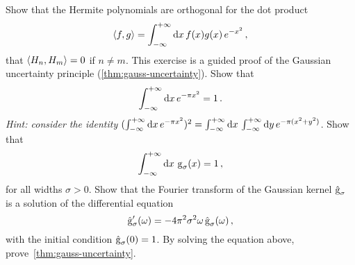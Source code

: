\begin{ExerciseList}
  \Question Show that the Hermite polynomials are orthogonal for the dot product
  \begin{equation}
    \braket{f,g}=\int_{-\infty}^{+\infty}\mathrm{d}{x}\,f(x)g(x)\,e^{-x^2}\,,
  \end{equation}
  \ie that $\braket{H_n,H_m}=0$ if $n\neq m$.
  \Exercise[label=gauss-uncertainty]
  This exercise is a guided proof of the
  Gaussian uncertainty principle (\cref{thm:gauss-uncertainty}).
  \Question Show that
  \begin{equation}
    \int_{-\infty}^{+\infty}\mathrm{d}{x}\,e^{-\pi x^2}=1\,.
  \end{equation}
  \emph{Hint: consider the identity }
  $(\int_{-\infty}^{+\infty}\mathrm{d}{x}\,e^{-\pi x^2})^2=\int_{-\infty}^{+\infty}\mathrm{d}{x}\,\int_{-\infty}^{+\infty}\mathrm{d}{y}\,e^{-\pi (x^2+y^2)}$.
  \Question Show that
  \begin{equation}
    \int_{-\infty}^{+\infty}\mathrm{d}{x}\,\operatorname{g}_{\sigma}(x)=1\,,
  \end{equation}
  for all widths $\sigma>0$.
  \Question Show that the Fourier transform of the Gaussian kernel $\hat{\operatorname{g}}_{\sigma}$
  is a solution of the differential equation
  \begin{equation}
    \hat{\operatorname{g}}_{\sigma}'(\omega)=-4\pi^2\sigma^2\omega\,\hat{\operatorname{g}}_{\sigma}(\omega)\,,
  \end{equation}
  with the initial condition $\hat{\operatorname{g}}_{\sigma}(0)=1$.
  \Question By solving the equation above, prove~\cref{thm:gauss-uncertainty}.
\end{ExerciseList}